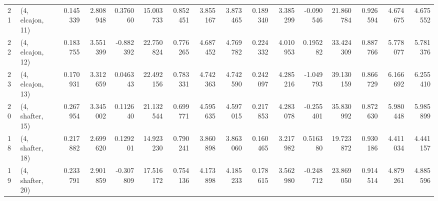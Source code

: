 \begin{tabular}{llrrrrrrrrrrrrrr}
21 &  (4, elcajon, 11) &   0.145339 &  2.808948 &  0.376060 &  15.003733 &  0.852451 &   3.855167 &  3.873465 &  0.189340 &   3.385299 & -0.090546 &   21.860784 &  0.926594 &   4.674675 &   4.675552 \\
22 &  (4, elcajon, 12) &   0.183755 &  3.551399 & -0.882392 &  22.750824 &  0.776265 &   4.687452 &  4.769782 &  0.224332 &   4.010953 &  0.195282 &   33.424309 &  0.887766 &   5.778077 &   5.781376 \\
23 &  (4, elcajon, 13) &   0.170931 &  3.312659 &  0.046343 &  22.492156 &  0.783331 &   4.742363 &  4.742590 &  0.242097 &   4.285216 & -1.049793 &   39.130159 &  0.866729 &   6.166692 &   6.255410 \\
20 &  (4, shafter, 15) &   0.267954 &  3.345002 &  0.112640 &  21.132544 &  0.699771 &   4.595635 &  4.597015 &  0.217853 &   4.283078 & -0.255401 &   35.830992 &  0.872630 &   5.980448 &   5.985899 \\
18 &  (4, shafter, 18) &   0.217882 &  2.699620 &  0.129201 &  14.923230 &  0.790241 &   3.860898 &  3.863060 &  0.160465 &   3.217982 &  0.516380 &   19.723872 &  0.930186 &   4.411034 &   4.441157 \\
19 &  (4, shafter, 20) &   0.233791 &  2.901859 & -0.307809 &  17.516172 &  0.754136 &   4.173898 &  4.185233 &  0.178615 &   3.562980 & -0.248712 &   23.869050 &  0.914514 &   4.879261 &   4.885596 \\
\bottomrule
\end{tabular}
